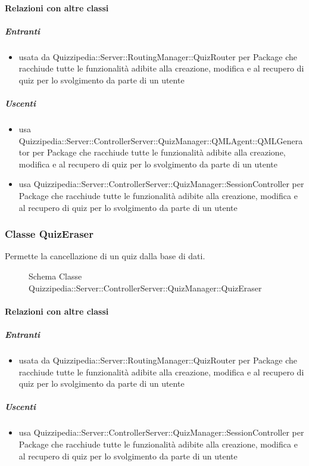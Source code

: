 \paragraph{Relazioni con altre classi}
\subparagraph{Entranti}
\begin{itemize}
\item usata da Quizzipedia::Server::RoutingManager::QuizRouter per Package che racchiude tutte le funzionalità adibite alla creazione, modifica e al recupero di quiz per lo svolgimento da parte di un utente
\end{itemize}
\subparagraph{Uscenti}
\begin{itemize}
\item usa Quizzipedia::Server::ControllerServer::QuizManager::QMLAgent::QMLGenerator per Package che racchiude tutte le funzionalità adibite alla creazione, modifica e al recupero di quiz per lo svolgimento da parte di un utente
\item usa Quizzipedia::Server::ControllerServer::QuizManager::SessionController per Package che racchiude tutte le funzionalità adibite alla creazione, modifica e al recupero di quiz per lo svolgimento da parte di un utente
\end{itemize}
\subsubsection{Classe QuizEraser}
Permette la cancellazione di un quiz dalla base di dati.
\begin{figure}[H]
\centering
\noindent{}
\caption[Schema Classe QuizEraser]{Schema Classe Quizzipedia::Server::ControllerServer::QuizManager::QuizEraser}
\end{figure}
\paragraph{Relazioni con altre classi}
\subparagraph{Entranti}
\begin{itemize}
\item usata da Quizzipedia::Server::RoutingManager::QuizRouter per Package che racchiude tutte le funzionalità adibite alla creazione, modifica e al recupero di quiz per lo svolgimento da parte di un utente
\end{itemize}
\subparagraph{Uscenti}
\begin{itemize}
\item usa Quizzipedia::Server::ControllerServer::QuizManager::SessionController per Package che racchiude tutte le funzionalità adibite alla creazione, modifica e al recupero di quiz per lo svolgimento da parte di un utente
\end{itemize}
